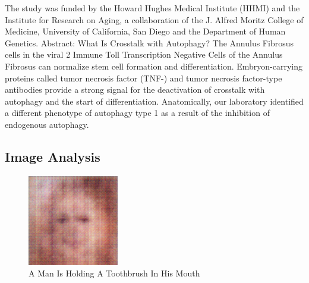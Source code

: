 \documentclass{article}%
\begin{document}
The study was funded by the Howard Hughes Medical Institute (HHMI) and the Institute for Research on Aging, a collaboration of the J. Alfred Moritz College of Medicine, University of California, San Diego and the Department of Human Genetics.\newline%
Abstract: What Is Crosstalk with Autophagy? The Annulus Fibrosus cells in the viral 2 Immune Toll Transcription Negative Cells of the Annulus Fibrosus can normalize stem cell formation and differentiation. Embryon{-}carrying proteins called tumor necrosis factor (TNF{-}) and tumor necrosis factor{-}type antibodies provide a strong signal for the deactivation of crosstalk with autophagy and the start of differentiation. Anatomically, our laboratory identified a different phenotype of autophagy type 1 as a result of the inhibition of endogenous autophagy.

%
\subsection{Image Analysis}%
\label{subsec:ImageAnalysis}%


\begin{figure}[h!]%
\centering%
\includegraphics[width=150px]{500_fake_images/samples_5_450.png}%
\caption{A Man Is Holding A Toothbrush In His Mouth}%
\end{figure}

%
\end{document}
